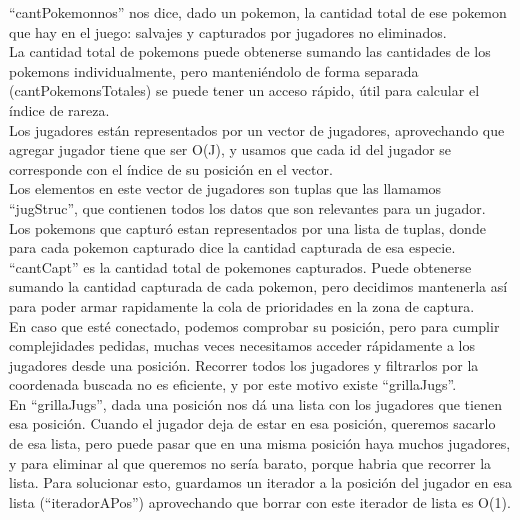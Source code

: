 \begin{Representacion}

``cantPokemonnos'' nos dice, dado un pokemon, la cantidad total de ese pokemon que hay en el juego: salvajes y capturados por jugadores no eliminados. \\
La cantidad total de pokemons puede obtenerse sumando las cantidades de los pokemons individualmente, pero manteni\'endolo de forma separada (cantPokemonsTotales) se puede tener un acceso r\'apido, \'util para calcular el \'indice de rareza. \\

Los jugadores est\'an representados por un vector de jugadores, aprovechando que agregar jugador tiene que ser O(J), y usamos que cada id del jugador se corresponde con el \'indice de su posici\'on en el vector. \\
Los elementos en este vector de jugadores son tuplas que las llamamos ``jugStruc'', que contienen todos los datos que son relevantes para un jugador. \\
Los pokemons que captur\'o estan representados por una lista de tuplas, donde para cada pokemon capturado dice la cantidad capturada de esa especie. ``cantCapt'' es la cantidad total de pokemones capturados. Puede obtenerse sumando la cantidad capturada de cada pokemon, pero decidimos mantenerla as\'i para poder armar rapidamente la cola de prioridades en la zona de captura.\\

En caso que est\'e conectado, podemos comprobar su posici\'on, pero para cumplir complejidades pedidas, muchas veces necesitamos acceder r\'apidamente a los jugadores desde una posici\'on. Recorrer todos los jugadores y filtrarlos por la coordenada buscada no es eficiente, y por este motivo existe ``grillaJugs''.  \\

En ``grillaJugs'', dada una posici\'on nos d\'a una lista con los jugadores que tienen esa posici\'on. Cuando el jugador deja de estar en esa posici\'on, queremos sacarlo de esa lista, pero puede pasar que en una misma posici\'on haya muchos jugadores, y para eliminar al que queremos no ser\'ia barato, porque habria que recorrer la lista. Para solucionar esto, guardamos un iterador a la posici\'on del jugador en esa lista (``iteradorAPos'') aprovechando que borrar con este iterador de lista es O(1). \\


\end{Representacion}
